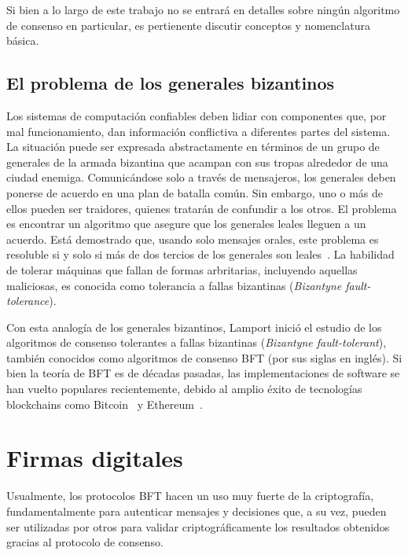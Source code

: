 %

Si bien a lo largo de este trabajo no se entrará en detalles sobre ningún algoritmo de consenso en particular,
es pertienente discutir conceptos y nomenclatura básica.

\subsection{El problema de los generales bizantinos}

Los sistemas de computación confiables deben lidiar con componentes que, por mal funcionamiento,
dan información conflictiva a diferentes partes del sistema.
La situación puede ser expresada abstractamente
en términos de un grupo de generales de la armada bizantina que acampan con sus tropas alrededor de una
ciudad enemiga.
Comunicándose solo a través de mensajeros, los generales deben ponerse de acuerdo en una plan
de batalla común.
Sin embargo, uno o más de ellos pueden ser traidores, quienes tratarán de confundir a los
otros.
El problema es encontrar un algoritmo que asegure que los generales leales lleguen a un acuerdo.
Está demostrado que, usando solo mensajes orales, este problema es resoluble si y solo si más de dos tercios
de los generales son leales~\cite{byzantineproblem}.
La habilidad de tolerar máquinas que fallan de formas arbritarias, incluyendo aquellas maliciosas,
es conocida como tolerancia a fallas bizantinas (\textit{Bizantyne fault-tolerance}).

%

Con esta analogía de los generales bizantinos, Lamport inició el estudio de los algoritmos de consenso tolerantes a fallas
bizantinas (\textit{Bizantyne fault-tolerant}), también conocidos como algoritmos de consenso BFT (por sus siglas en inglés).
Si bien la teoría de
BFT es de décadas pasadas, las implementaciones de software se han vuelto populares recientemente,
debido al amplio éxito de tecnologías blockchains como Bitcoin~\cite{nakamoto06bitcoin} y Ethereum~\cite{ethereum}.

\section{Firmas digitales}\label{subsec:signatures}
Usualmente, los protocolos BFT hacen un uso muy fuerte de la criptografía, fundamentalmente para autenticar
mensajes y decisiones que, a su vez, pueden ser utilizadas por otros para validar criptográficamente los resultados
obtenidos gracias al protocolo de consenso.

